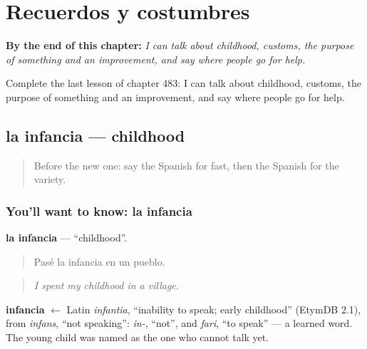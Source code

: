 
\chapter{Recuerdos y costumbres}
\label{ch:es-recuerdos-y-costumbres}

\begin{chapteropening}
\textbf{By the end of this chapter:} \emph{I can talk about childhood, customs, the purpose of something and an improvement, and say where people go for help.}

Complete the last lesson of chapter 483: I can talk about childhood, customs, the purpose of something and an improvement, and say where people go for help.
\end{chapteropening}

\section[la infancia]{la infancia — childhood}

\label{lesson:ES-C483-infancia}



\begin{quote}
Before the new one: say the Spanish for fast, then the Spanish for the variety.
\end{quote}

\subsection*{You'll want to know: la infancia}
\textbf{la infancia} — \textquotedblleft{}childhood\textquotedblright{}.

\begin{quote}
Pasé la infancia en un pueblo.
\end{quote}

\begin{quote}
\emph{I spent my childhood in a village.}
\end{quote}

\begin{cousinweb}
\textbf{infancia} $\leftarrow$ Latin \emph{infantia}, \textquotedblleft{}inability to speak; early childhood\textquotedblright{} (EtymDB 2.1), from \emph{infans}, \textquotedblleft{}not speaking\textquotedblright{}: \emph{in-}, \textquotedblleft{}not\textquotedblright{}, and \emph{fari}, \textquotedblleft{}to speak\textquotedblright{} — a learned word. The young child was named as the one who cannot talk yet.
\end{cousinweb}

